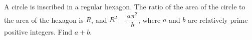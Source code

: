 A circle is inscribed in a regular hexagon. The ratio of the area of the circle to the area of the hexagon is $R$, and $R^2=\dfrac{a\pi^2}{b}$, where $a$ and $b$ are relatively prime positive integers. Find $a+b$.

